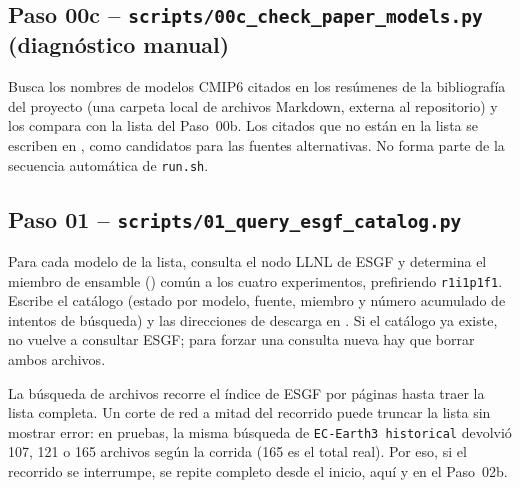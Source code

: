 \subsection{Paso 00c -- \texttt{scripts/00c\_check\_paper\_models.py} (diagnóstico manual)}
Busca los nombres de modelos CMIP6 citados en los resúmenes de la bibliografía del proyecto (una carpeta local de archivos Markdown, externa al repositorio) y los compara con la lista del Paso~00b. Los citados que no están en la lista se escriben en , como candidatos para las fuentes alternativas. No forma parte de la secuencia automática de \texttt{run.sh}.

\subsection{Paso 01 -- \texttt{scripts/01\_query\_esgf\_catalog.py}}
Para cada modelo de la lista, consulta el nodo LLNL de ESGF y determina el miembro de ensamble () común a los cuatro experimentos, prefiriendo \texttt{r1i1p1f1}. Escribe el catálogo  (estado por modelo, fuente, miembro y número acumulado de intentos de búsqueda) y las direcciones de descarga en . Si el catálogo ya existe, no vuelve a consultar ESGF; para forzar una consulta nueva hay que borrar ambos archivos.

La búsqueda de archivos recorre el índice de ESGF por páginas hasta traer la lista completa. Un corte de red a mitad del recorrido puede truncar la lista sin mostrar error: en pruebas, la misma búsqueda de \texttt{EC-Earth3 historical} devolvió 107, 121 o 165 archivos según la corrida (165 es el total real). Por eso, si el recorrido se interrumpe, se repite completo desde el inicio, aquí y en el Paso~02b.

